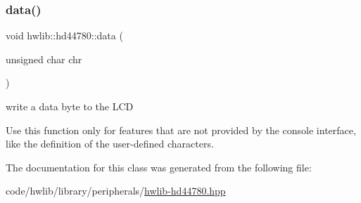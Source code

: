 \subsubsection{\texorpdfstring{data()}{data()}}
{\footnotesize\ttfamily void hwlib\+::hd44780\+::data (\begin{DoxyParamCaption}\item[{unsigned char}]{chr }\end{DoxyParamCaption})\hspace{0.3cm}{\ttfamily [inline]}}

write a data byte to the L\+CD

Use this function only for features that are not provided by the console interface, like the definition of the user-\/defined characters. 

The documentation for this class was generated from the following file\+:\begin{DoxyCompactItemize}
\item 
code/hwlib/library/peripherals/\hyperlink{hwlib-hd44780_8hpp}{hwlib-\/hd44780.\+hpp}\end{DoxyCompactItemize}
